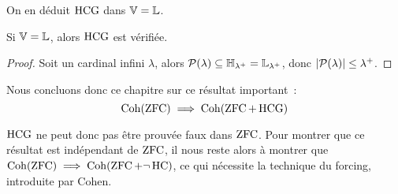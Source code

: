 On en déduit $\operatorname{HCG}$ dans $\mathbb V = \mathbb L$.

\begin{theorem}
  Si $\mathbb V = \mathbb L$, alors $\operatorname{HCG}$ est vérifiée.
\end{theorem}

\begin{proof}
  Soit un cardinal infini $\lambda$, alors
  $\mathcal{P}(\lambda) \subseteq \mathbb H_{\lambda^+} = \mathbb L_{\lambda^+}$,
  donc $|\mathcal{P}(\lambda)| \leq \lambda^+$.
\end{proof}

Nous concluons donc ce chapitre sur ce résultat important~:
\[\operatorname{Coh}(\operatorname{ZFC}) \implies \operatorname{Coh}(\operatorname{ZFC} + \operatorname{HCG})\]

$\operatorname{HCG}$ ne peut donc pas être prouvée faux dans $\operatorname{ZFC}$. Pour montrer que ce
résultat est indépendant de $\operatorname{ZFC}$, il nous reste alors à montrer que
$\operatorname{Coh}(\operatorname{ZFC})\implies\operatorname{Coh}(\operatorname{ZFC}+\lnot\operatorname{HC})$, ce qui nécessite la technique du
forcing, introduite par Cohen.
